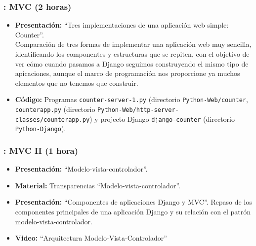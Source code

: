 \documentclass[a4paper,12pt]{article}
\begin{document}
\subsubsection{\martesG: MVC (2 horas)}
\label{cal:martesG}

\begin{itemize}
\item \textbf{Presentación:} ``Tres implementaciones de una aplicación web simple: Counter''. \\
  Comparación de tres formas de implementar una aplicación web muy sencilla, identificando los componentes y estructuras que se repiten, con el objetivo de ver cómo cuando pasamos a Django seguimos construyendo el mismo tipo de apicaciones, aunque el marco de programación nos proporcione ya muchos elementos que no tenemos que construir.
\item \textbf{Código:} Programas \verb|counter-server-1.py| (directorio \verb|Python-Web/counter|, \verb|counterapp.py| (directorio \verb|Python-Web/http-server-classes/counterapp.py|) y projecto Django \verb|django-counter| (directorio \verb|Python-Django|).
%

\end{itemize}

\subsubsection{\martesH: MVC II (1 hora)}
\label{cal:martesH}


\begin{itemize}
\item \textbf{Presentación:} ``Modelo-vista-controlador''.
\item \textbf{Material:} Transparencias ``Modelo-vista-controlador''.
\item \textbf{Presentación:} ``Componentes de aplicaciones Django y MVC''.
  Repaso de los componentes principales de una aplicación Django y su relación con el patrón modelo-vista-controlador.
\item \textbf{Video:} ``Arquitectura Modelo-Vista-Controlador''
\end{itemize}
\end{document}
